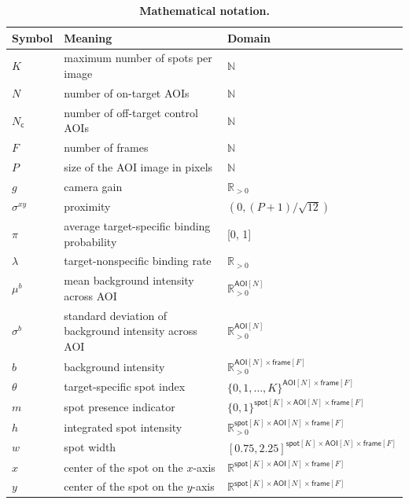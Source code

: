 \begin{table}[h]
\caption{\label{tab:parameters} \textbf{Mathematical notation.}}
\begin{tabular}{l l l}
\toprule
Symbol & Meaning & Domain \\
\midrule
$K$ & maximum number of spots per image & $\mathbb{N}$ \\
$N$ & number of on-target AOIs & $\mathbb{N}$ \rule{0pt}{3ex} \\
$N_\mathsf{c}$ & number of off-target control AOIs & $\mathbb{N}$ \rule{0pt}{3ex} \\
$F$ & number of frames & $\mathbb{N}$ \rule{0pt}{3ex} \\
$P$ & size of the AOI image in pixels & $\mathbb{N}$ \rule{0pt}{3ex} \\
$g$ & camera gain & $\mathbb{R}_{>0}$ \rule{0pt}{3ex} \\
$\sigma^{xy}$ & proximity & $(0, (P+1)/\sqrt{12})$ \rule{0pt}{3ex} \\
$\pi$ & average target-specific binding probability & [0, 1] \rule{0pt}{3ex} \\
$\lambda$ & target-nonspecific binding rate & $\mathbb{R}_{>0}$ \rule{0pt}{3ex} \\
$\mu^b$ & mean background intensity across AOI & $\mathbb{R}_{>0}^{\mathsf{AOI}[N]}$ \rule{0pt}{3ex} \\
$\sigma^b$ & standard deviation of background intensity across AOI & $\mathbb{R}_{>0}^{\mathsf{AOI}[N]}$ \rule{0pt}{3ex} \\
$b$ & background intensity & $\mathbb{R}_{>0}^{\mathsf{AOI}[N] \times \mathsf{frame}[F]}$ \rule{0pt}{3ex} \\
$\theta$ & target-specific spot index & $\{0, 1, \dots, K \}^{\mathsf{AOI}[N] \times \mathsf{frame}[F]}$ \rule{0pt}{3ex} \\
$m$ & spot presence indicator & $\{ 0, 1 \}^{\mathsf{spot}[K] \times \mathsf{AOI}[N] \times \mathsf{frame}[F]}$ \rule{0pt}{3ex} \\
$h$ & integrated spot intensity & $\mathbb{R}_{>0}^{\mathsf{spot}[K] \times \mathsf{AOI}[N] \times \mathsf{frame}[F]}$ \rule{0pt}{3ex} \\
$w$ & spot width & $[0.75, 2.25]^{\mathsf{spot}[K] \times \mathsf{AOI}[N] \times \mathsf{frame}[F]}$ \rule{0pt}{3ex} \\
$x$ & center of the spot on the $x$-axis & $\mathbb{R}^{\mathsf{spot}[K] \times \mathsf{AOI}[N] \times \mathsf{frame}[F]}$ \rule{0pt}{3ex} \\
$y$ & center of the spot on the $y$-axis & $\mathbb{R}^{\mathsf{spot}[K] \times \mathsf{AOI}[N] \times \mathsf{frame}[F]}$ \rule{0pt}{3ex} \\

\end{tabular}
\end{table}
